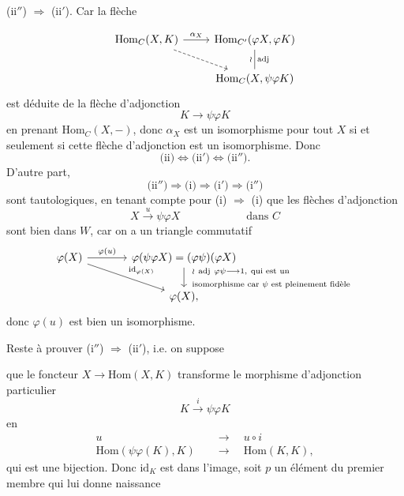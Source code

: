 \documentclass[11pt]{article}
\newcommand{\printedpage}[1]{\marginpar{\footnotesize p.~#1}}
\newcommand{\msp}[1]{\marginpar{\footnotesize [#1]}}
\newcommand{\Hom}{\mathrm{Hom}}
\newcommand{\id}{\mathrm{id}}
\begin{document}
(ii$''$) $\Longrightarrow$ (ii$'$). Car la flèche

\printedpage{24}

\[
\begin{tikzcd}
\Hom_C(X,K) \arrow[r,"\alpha_X"] \arrow[dr,dashed] & \Hom_{C'}(\varphi X,\varphi K) \arrow[d,dash,"\wr"',"\mathrm{adj}"] \\
 & \Hom_C(X,\psi\varphi K)
\end{tikzcd}
\]
est déduite de la flèche d'adjonction
\[
K \longrightarrow \psi\varphi K
\]
en prenant $\Hom_C(X,-)$, donc $\alpha_X$ est un isomorphisme pour tout $X$ si et seulement si cette flèche d'adjonction est un isomorphisme. Donc
\[
\text{(ii)} \Longleftrightarrow \text{(ii$'$)} \Longleftrightarrow \text{(ii$''$)}.
\]
D'autre part,
\[
\text{(ii$''$)} \Longrightarrow \text{(i)} \Longrightarrow \text{(i$'$)} \Longrightarrow \text{(i$''$)}
\]
sont tautologiques, en tenant compte pour (i) $\Longrightarrow$ (i) que les flèches d'adjonction
\[
X \xrightarrow{u} \psi\varphi X \qquad\qquad\qquad \text{dans } C
\]
sont bien dans $W$, car on a un triangle commutatif
\[
\begin{tikzcd}[column sep=large]
\varphi(X) \arrow[r,"\varphi(u)"] \arrow[dr,"\id_{\varphi(X)}"] & \varphi(\psi\varphi X) = (\varphi\psi)(\varphi X) \arrow[d,"{\begin{array}{l}\wr\ \mathrm{adj}\ \varphi\psi \longrightarrow 1,\ \text{qui est un}\\ \text{isomorphisme car } \psi \text{ est pleinement fidèle}\end{array}}"] \\
 & \varphi(X),
\end{tikzcd}
\]
donc $\varphi(u)$ est bien un isomorphisme.

Reste à prouver (i$''$) $\Longrightarrow$ (ii$'$), i.e. on suppose

\noindent\msp{page 39}%
que le foncteur $X \longrightarrow \Hom(X,K)$ transforme le morphisme d'adjonction particulier
\[
K \xrightarrow{i} \psi\varphi K
\]
en
\[
\begin{aligned}
u \quad &\longrightarrow \quad u\circ i\\
\Hom(\psi\varphi(K),K) \quad &\longrightarrow \quad \Hom(K,K),
\end{aligned}
\]
qui est une bijection. Donc $\id_K$ est dans l'image, soit $p$ un élément du premier membre qui lui donne naissance

\printedpage{25}
\end{document}
